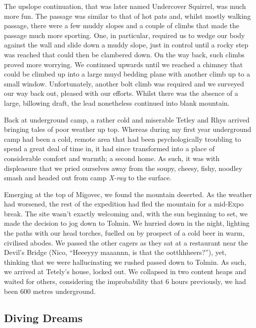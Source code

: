 The upslope continuation, that was later named Undercover Squirrel, was
much more fun. The passage was similar to that of hot pats and, whilst
mostly walking passage, there were a few muddy slopes and a couple of
climbs that made the passage much more sporting. One, in particular,
required us to wedge our body against the wall and slide down a muddy
slope, just in control until a rocky step was reached that could then be
clambered down. On the way back, such climbs proved more worrying. We
continued upwards until we reached a chimney that could be climbed up
into a large muyd bedding plane with another climb up to a small window.
Unfortunately, another bolt climb was required and we surveyed our way
back out, pleased with our efforts. Whilst there was the absence of a
large, billowing draft, the lead nonetheless continued into blank
mountain.

Back at underground camp, a rather cold and miserable Tetley and Rhys
arrived bringing tales of poor weather up top. Whereas during my first
year underground camp had been a cold, remote area that had been
psychologically troubling to spend a great deal of time in, it had since
transformed into a place of considerable comfort and warmth; a second
home. As such, it was with displeasure that we pried ourselves away from
the soupy, cheesy, fishy, noodley smash and headed out from camp
\emph{X-ray} to the surface.

Emerging at the top of Migovec, we found the mountain deserted. As the
weather had worsened, the rest of the expedition had fled the mountain
for a mid-Expo break. The site wasn't exactly welcoming and, with the
sun beginning to set, we made the decision to jog down to Tolmin. We
hurried down in the night, lighting the paths with our head torches,
fuelled on by prospect of a cold beer in warm, civilised abodes. We
passed the other cagers as they sat at a restaurant near the Devil's
Bridge (Nico, ``Heeeyyy maaannn, is that the ootthhheers?''), yet,
thinking that we were hallucinating we rushed passed down to Tolmin. As
such, we arrived at Tetely's house, locked out. We collapsed in two
content heaps and waited for others, considering the improbability that
6 hours previously, we had been 600 metres underground.



\subsection{Diving Dreams}


